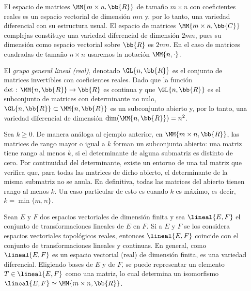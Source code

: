 \begin{ejemplo}
	El espacio de matrices $\MM{m\times n,\bb{R}}$ de tama\~{n}o
	$m\times n$ con coeficientes reales es un espacio vectorial de
	dimensi\'{o}n $mn$ y, por lo tanto, una variedad diferencial con
	su estructura usual. El espacio de matrices $\MM{m\times n,\bb{C}}$
	complejas constituye una variedad diferencial de dimensi\'{o}n $2mn$,
	pues su dimensi\'{o}n como espacio vectorial sobre $\bb{R}$ es $2mn$.
	En el caso de matrices cuadradas de tama\~{n}o $n\times n$ usaremos
	la notaci\'{o}n $\MM{n,\cdot}$.
\end{ejemplo}

\begin{ejemplo}
	El \emph{grupo general lineal (real)}, denotado $\GL{n,\bb{R}}$
	es el conjunto de matrices invertibles con coeficientes reales.
	Dado que la funci\'{o}n $\det:\,\MM{n,\bb{R}}\rightarrow\bb{R}$
	es continua y que $\GL{n,\bb{R}}$ es el subconjunto de matrices
	con determinante no nulo, $\GL{n,\bb{R}}\subset\MM{n,\bb{R}}$ es
	un subconjunto abierto y, por lo tanto, una variedad diferencial
	de dimensi\'{o}n $\dim(\MM{n,\bb{R}})=n^{2}$.
\end{ejemplo}

\begin{ejemplo}
	Sea $k\geq 0$. De manera an\'{a}loga al ejemplo anterior, en
	$\MM{m\times n,\bb{R}}$, las matrices de rango mayor o igual a $k$
	forman un subconjunto abierto: una matriz tiene rango al menos $k$,
	si el determinante de alguna submatriz es distinto de cero. Por
	continuidad del determinante, existe un entorno de una tal matriz
	que verifica que, para todas las matrices de dicho abierto, el
	determinante de la misma submatriz no se anula. En definitiva, todas
	las matrices del abierto tienen rango al menos $k$. Un caso particular
	de esto es cuando $k$ es m\'{a}ximo, es decir, $k=\min\{m,n\}$.
\end{ejemplo}

\begin{ejemplo}
	Sean $E$ y $F$ dos espacios vectoriales de dimensi\'{o}n finita
	y sea $\lineal{E,F}$ el conjunto de transformaciones lineales
	de $E$ en $F$. Si a $E$ y $F$ se los considera espacios vectoriales
	topol\'{o}gicos reales, entonces $\lineal{E,F}$ coincide con
	el conjunto de transformaciones lineales y continuas. En general,
	como $\lineal{E,F}$ es un espacio vectorial (real) de dimensi\'{o}n
	finita, es una variedad diferencial. Eligiendo bases de $E$ y de $F$,
	se puede representar un elemento $T\in\lineal{E,F}$ como una matriz,
	lo cual determina un isomorfismo
	$\lineal{E,F}\simeq\MM{m\times n,\bb{R}}$.
\end{ejemplo}

